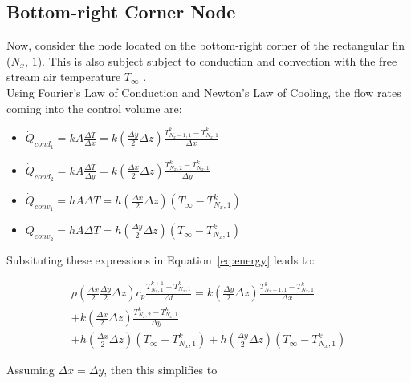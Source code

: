 \documentclass{article}
\newcommand{\ddfrac}[2]{\frac{\displaystyle #1}{\displaystyle #2}}
\begin{document}
\subsection{Bottom-right Corner Node}
Now, consider the node located on the bottom-right corner of the rectangular fin ($N_x$, $1$). This is also subject subject to conduction and convection with the free stream air temperature $T_{\infty}$ .\\

Using Fourier's Law of Conduction and Newton's Law of Cooling, the flow rates coming into the control volume are:

\begin{itemize}
    \item $\dot{Q}_{cond_{1}} = kA\ddfrac{\Delta T}{\Delta x} = k(\ddfrac{\Delta y}{2} \Delta z) \ddfrac{T_{N_x-1,1}^k - T_{N_x,1}^k}{\Delta x}$
    \item $\dot{Q}_{cond_{2}} = kA\ddfrac{\Delta T}{\Delta y} = k(\ddfrac{\Delta x}{2} \Delta z) \ddfrac{T_{N_x,2}^k - T_{N_x,1}^k}{\Delta y}$
    \item $\dot{Q}_{conv_{1}} = hA\Delta T = h(\ddfrac{\Delta x}{2} \Delta z) \left(T_{\infty} - T_{N_x,1}^k\right)$
    \item $\dot{Q}_{conv_{2}} = hA\Delta T = h(\ddfrac{\Delta y}{2} \Delta z)\left(T_{\infty} - T_{N_x,1}^k\right)$
\end{itemize}

Subsituting these expressions in Equation~\eqref{eq:energy} leads to:

\begin{multline*}
    \rho\left(\ddfrac{\Delta x}{2} \ddfrac{\Delta y}{2} \Delta z\right) c_p \ddfrac{T_{N_x,1}^{k+1} - T_{N_x,1}^k}{\Delta t} = k(\ddfrac{\Delta y}{2} \Delta z) \ddfrac{T_{N_x-1,1}^k - T_{N_x,1}^k}{\Delta x} \\
    + k(\ddfrac{\Delta x}{2} \Delta z) \ddfrac{T_{N_x,2}^k - T_{N_x,1}^k}{\Delta y} \\
    + h(\ddfrac{\Delta x}{2} \Delta z) \left(T_{\infty} - T_{N_x,1}^k\right)
    + h(\ddfrac{\Delta y}{2} \Delta z)\left(T_{\infty} - T_{N_x,1}^k\right)
\end{multline*}

Assuming $\Delta x = \Delta y$, then this simplifies to 
\begin{center}
    \noindent {}        
\end{center}
\end{document}
